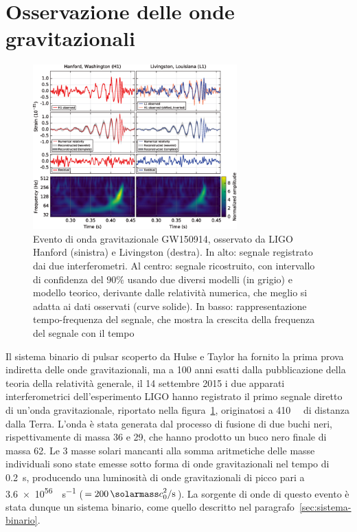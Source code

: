 \section{Osservazione delle onde gravitazionali}
\label{sec:osservazione-onde}

\begin{figure}
  \centering
  \includegraphics[width=0.7\textwidth]{figure/ligo-grav-wave-signal}
  \caption{Evento di onda gravitazionale GW150914, osservato da LIGO Hanford
    (sinistra) e Livingston (destra).  In alto: segnale registrato dai due
    interferometri.  Al centro: segnale ricostruito, con intervallo di
    confidenza del \(90\%\) usando due diversi modelli (in grigio) e modello
    teorico, derivante dalle relatività numerica, che meglio si adatta ai dati
    osservati (curve solide).  In basso: rappresentazione tempo-frequenza del
    segnale, che mostra la crescita della frequenza del segnale con il tempo}
  \label{fig:ligo-grav-wave}
\end{figure}
Il sistema binario di pulsar scoperto da Hulse e Taylor ha fornito la prima
prova indiretta delle onde gravitazionali, ma a 100 anni esatti dalla
pubblicazione della teoria della relatività generale, il 14 settembre 2015 i due
apparati interferometrici dell'esperimento LIGO hanno registrato il primo
segnale diretto di un'onda gravitazionale, riportato nella
figura~\ref{fig:ligo-grav-wave}, originatosi a \SI{410}{\mega\parsec} di
distanza dalla Terra.  L'onda è stata generata dal processo di fusione di due
buchi neri, rispettivamente di massa \SI{36}{\solarmass} e \SI{29}{\solarmass},
che hanno prodotto un buco nero finale di massa \SI{62}{\solarmass}.  Le \(3\)
masse solari mancanti alla somma aritmetiche delle masse individuali sono state
emesse sotto forma di onde gravitazionali nel tempo di \SI{0.2}{\second},
producendo una luminosità di onde gravitazionali di picco pari a
\SI{3.6e56}{\erg\per\second}
(\(=\SI{200}{\solarmass\clight\squared\per\second}\)).  La sorgente di onde di
questo evento è stata dunque un sistema binario, come quello descritto nel
paragrafo~\ref{sec:sistema-binario}.

